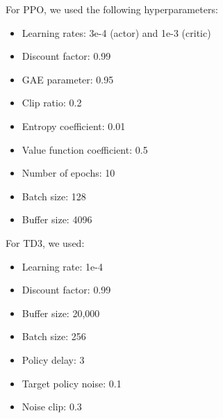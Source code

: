 \documentclass[12pt]{article}
\begin{document}

For PPO, we used the following hyperparameters:
\begin{itemize}
    \item Learning rates: 3e-4 (actor) and 1e-3 (critic)
    \item Discount factor: 0.99
    \item GAE parameter: 0.95
    \item Clip ratio: 0.2
    \item Entropy coefficient: 0.01
    \item Value function coefficient: 0.5
    \item Number of epochs: 10
    \item Batch size: 128
    \item Buffer size: 4096
\end{itemize}


For TD3, we used:
\begin{itemize}
    \item Learning rate: 1e-4
    \item Discount factor: 0.99
    \item Buffer size: 20,000
    \item Batch size: 256
    \item Policy delay: 3
    \item Target policy noise: 0.1
    \item Noise clip: 0.3
\end{itemize}
\end{document}
